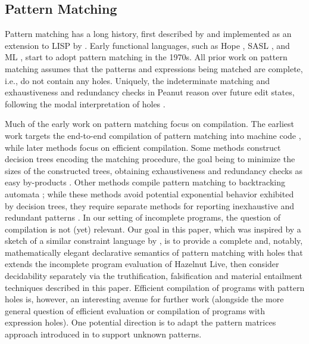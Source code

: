 \subsection{Pattern Matching}
Pattern matching has a long history, first described by \citet{DBLP:journals/cj/Burstall69} and implemented as an extension to LISP by \citet{DBLP:phd/ethos/McBride70}. Early functional languages,
such as Hope \cite{DBLP:conf/lfp/BurstallMS80}, SASL \cite{DBLP:journals/spe/Turner79}, and ML \cite{DBLP:journals/jcss/Milner78}, start to adopt pattern matching in the 1970s.
All prior work on pattern matching assumes that the patterns and expressions being matched are
complete, i.e., do not contain any holes.
Uniquely, the indeterminate matching and exhaustiveness and redundancy checks in Peanut
reason over future edit states,
following the modal interpretation of holes \cite{DBLP:journals/tocl/NanevskiPP08,DBLP:journals/pacmpl/OmarVCH19}.

Much of the early work on pattern matching focus on compilation. The earliest work targets the end-to-end compilation of pattern matching into machine code \cite{DBLP:conf/lfp/Cardelli84,DBLP:conf/lfp/Augustsson84,DBLP:conf/fpca/Augustsson85}, while later methods focus on efficient compilation. Some methods construct decision trees encoding the matching procedure, the goal being to minimize the sizes of the constructed trees, obtaining exhaustiveness and redundancy checks as easy by-products \cite{Aitken92smlnj,Baudinet85treepattern,Sestoft96mlpattern}.
Other methods compile pattern matching to backtracking automata \cite{Maranget94lazybacktracking,DBLP:journals/jfp/Maranget07};
while these methods avoid potential exponential behavior exhibited by decision trees, they require separate methods for reporting inexhaustive and redundant patterns \cite{DBLP:journals/jfp/Maranget07}.
In our setting of incomplete programs, the question of compilation is not (yet) relevant. Our goal in this paper, which was inspired by a sketch of a similar constraint language by \citet{Harper2012}, is to provide a complete and, notably, mathematically elegant declarative semantics of pattern matching with holes that extends the incomplete program evaluation of Hazelnut Live, then consider decidability separately via the truthification, falsification and material entailment techniques described in this paper.  
Efficient compilation of programs with pattern holes is, however, an interesting avenue for further work (alongside the more general question of efficient evaluation or compilation of programs with expression holes). One potential direction is to adapt the pattern matrices approach introduced in \citet{DBLP:journals/jfp/Maranget07} to support unknown patterns.

